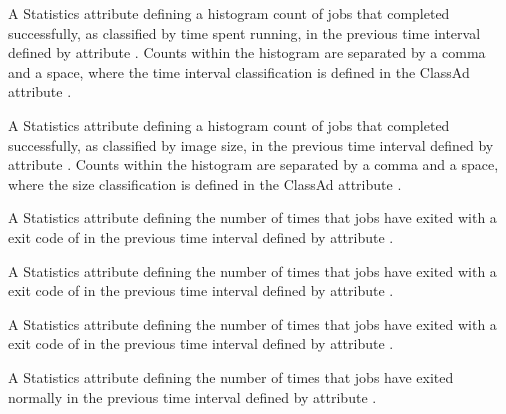 \begin{description}
\item[\AdAttr{RecentJobsCompletedRuntimes}:] A Statistics attribute defining
  a histogram count of jobs that completed successfully, 
  as classified by time spent running,
  in the previous time interval defined by attribute .
  Counts within the histogram are separated by a comma and a space,
  where the time interval classification is defined in the ClassAd attribute
  .

\item[\AdAttr{RecentJobsCompletedSizes}:] A Statistics attribute defining
  a histogram count of jobs that completed successfully,
  as classified by image size,
  in the previous time interval defined by attribute .
  Counts within the histogram are separated by a comma and a space, 
  where the size classification is defined in the ClassAd attribute
  .

\item[\AdAttr{RecentJobsCoredumped}:] A Statistics attribute defining
  the number of times that jobs have exited 
  with a  exit code of  
  in the previous time interval defined by attribute .

\item[\AdAttr{RecentJobsDebugLogError}:] A Statistics attribute defining
  the number of times that jobs have exited 
  with a  exit code of  
  in the previous time interval defined by attribute .

\item[\AdAttr{RecentJobsExecFailed}:] A Statistics attribute defining
  the number of times that jobs have exited 
  with a  exit code of  
  in the previous time interval defined by attribute .

\item[\AdAttr{RecentJobsExited}:] A Statistics attribute defining
  the number of times that jobs have exited normally
  in the previous time interval defined by attribute .


\end{description}

